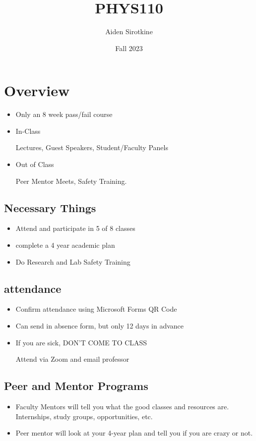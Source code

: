 \documentclass{report}
\date{Fall 2023}
\title{PHYS110}
\author{Aiden Sirotkine}
\begin{document}
\pagestyle{fancy}
\maketitle
\tableofcontents
\clearpage

\chapter{Overview}
\begin{itemize}
\item
Only an 8 week pass/fail course

\item
In-Class

Lectures, Guest Speakers, Student/Faculty Panels

\item
Out of Class

Peer Mentor Meets, Safety Training. 
\end{itemize}

\section*{Necessary Things}
\begin{itemize}
\item
Attend and participate in 5 of 8 classes

\item
complete a 4 year academic plan

\item
Do Research and Lab Safety Training

\end{itemize}


\section*{attendance}
\begin{itemize}
\item
Confirm attendance using Microsoft Forms QR Code

\item
Can send in absence form, but only 12 days in advance

\item
If you are sick, DON'T COME TO CLASS

Attend via Zoom and email professor

\end{itemize}

\section*{Peer and Mentor Programs}
\begin{itemize}
\item
Faculty Mentors will tell you what the good classes and resources are. Internships, study groups, opportunities, etc.

\item
Peer mentor will look at your 4-year plan and tell you if you are crazy or not. 

\end{itemize}
\end{document}
